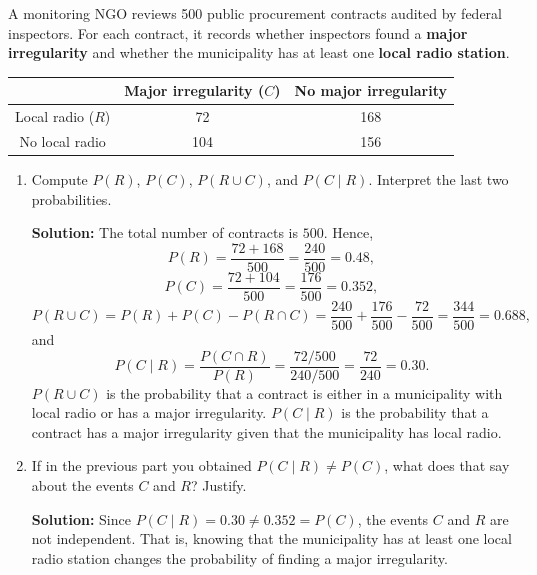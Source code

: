 \documentclass[11pt]{exam}
\begin{document}
\begin{questions}

\question[2.5]
A monitoring NGO reviews 500 public procurement contracts audited by federal inspectors. For each contract, it records whether inspectors found a \textbf{major irregularity} and whether the municipality has at least one \textbf{local radio station}.

\begin{center}
\begin{tabular}{ccc}
 & Major irregularity ($C$) & No major irregularity \\
\hline
Local radio ($R$) & 72 & 168 \\
No local radio & 104 & 156 \\
\hline
\end{tabular}
\end{center}

\begin{enumerate}[leftmargin = 0.5cm, label = (\alph*), rightmargin = 0.2cm]
    \vspace{0.3cm}
    \item Compute $P(R)$, $P(C)$, $P(R \cup C)$, and $P(C \mid R)$. Interpret the last two probabilities.

    \begin{solutionorbox}[7.8cm]
    \textbf{Solution:} The total number of contracts is $500$. Hence,
    \[
    P(R)=\frac{72+168}{500}=\frac{240}{500}=0.48,
    \]
    \[
    P(C)=\frac{72+104}{500}=\frac{176}{500}=0.352,
    \]
    \[
    P(R\cup C)= P(R) + P(C) - P(R\cap C) = \frac{240}{500} + \frac{176}{500} - \frac{72}{500} = \frac{344}{500} = 0.688,
    \]
    and
    \[
    P(C\mid R)=\frac{P(C\cap R)}{P(R)}=\frac{72/500}{240/500}=\frac{72}{240}=0.30.
    \]
    $P(R\cup C)$ is the probability that a contract is either in a municipality with local radio or has a major irregularity. $P(C\mid R)$ is the probability that a contract has a major irregularity given that the municipality has local radio.
    \end{solutionorbox}
    \vspace{0.5cm}
    \item If in the previous part you obtained $P(C \mid R) \neq P(C)$, what does that say about the events $C$ and $R$? Justify.

    \begin{solutionorbox}[4.7cm]
    \textbf{Solution:}
    Since $P(C\mid R)=0.30\neq 0.352=P(C)$, the events $C$ and $R$ are not independent. That is, knowing that the municipality has at least one local radio station changes the probability of finding a major irregularity.
    \end{solutionorbox}


\end{enumerate}
\end{questions}
\end{document}

